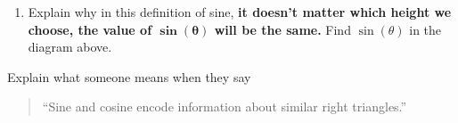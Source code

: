 \documentclass[noauthor,nooutcomes,hints,handout]{ximera}
\begin{document}
\begin{question}
\begin{enumerate}
     \item       
       Explain why in this definition of sine, \textbf{it doesn't matter which
        height we choose, the value of $\boldsymbol{\sin(\theta)}$ will be the same.}  Find $\sin(\theta)$ in the diagram above.
        \end{enumerate}
\end{question}

\mynewpage

\begin{question}
  Explain what someone means when they say
  \begin{quote}
    ``Sine and cosine encode information about similar right
    triangles.''
  \end{quote}
\end{question}
\end{document}
